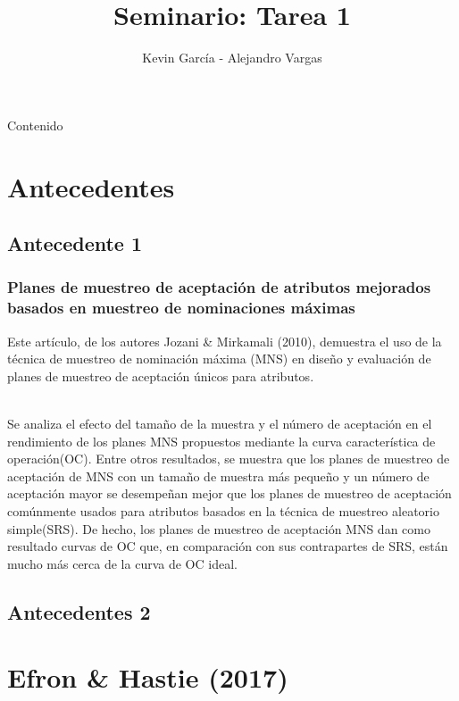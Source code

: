 \documentclass[10pt]{beamer}
\author{Kevin García - Alejandro Vargas}
\title{Seminario: Tarea 1}
\begin{document}
\begin{frame}[plain]
\maketitle
\end{frame}

\begin{frame}{Contenido}
\tableofcontents
\end{frame}

\section{Antecedentes}
\subsection{Antecedente 1}
\begin{frame}
\frametitle{Planes de muestreo de aceptación de atributos mejorados basados en muestreo de nominaciones máximas}
Este artículo, de los autores Jozani \& Mirkamali (2010), demuestra el uso de la técnica de muestreo de nominación máxima (MNS) en diseño y evaluación de planes de muestreo de aceptación únicos para atributos.


~\\Se analiza el efecto del tamaño de la muestra y el número de aceptación en el rendimiento de los planes MNS propuestos mediante la curva característica de operación(OC). Entre otros resultados, se muestra que los planes de muestreo de aceptación de MNS con un tamaño de muestra más pequeño y un número de aceptación mayor se desempeñan mejor que los planes de muestreo de aceptación comúnmente usados para atributos basados en la técnica de muestreo aleatorio simple(SRS). De hecho, los planes de muestreo de aceptación MNS dan como resultado curvas de OC que, en comparación con sus contrapartes de SRS, están mucho más cerca de la curva de OC ideal.  
\end{frame}

\subsection{Antecedentes 2}
\begin{frame}
\frametitle{}
\end{frame}

\section{Efron \& Hastie (2017)}
\end{document}
